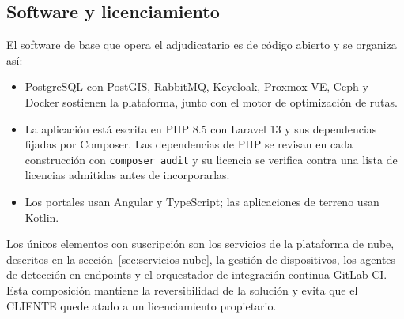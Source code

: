 \subsection{Software y licenciamiento}

El software de base que opera el adjudicatario es de código abierto y se organiza así:

\begin{itemize}
  \item PostgreSQL con PostGIS, RabbitMQ, Keycloak, Proxmox VE, Ceph y Docker sostienen la plataforma, junto con el motor de optimización de rutas.
  \item La aplicación está escrita en PHP 8.5 con Laravel 13 y sus dependencias fijadas por Composer. Las dependencias de PHP se revisan en cada construcción con \texttt{composer audit} y su licencia se verifica contra una lista de licencias admitidas antes de incorporarlas.
  \item Los portales usan Angular y TypeScript; las aplicaciones de terreno usan Kotlin.
\end{itemize}

Los únicos elementos con suscripción son los servicios de la plataforma de nube, descritos en la sección~\ref{sec:servicios-nube}, la gestión de dispositivos, los agentes de detección en endpoints y el orquestador de integración continua GitLab CI. Esta composición mantiene la reversibilidad de la solución y evita que el CLIENTE quede atado a un licenciamiento propietario.
